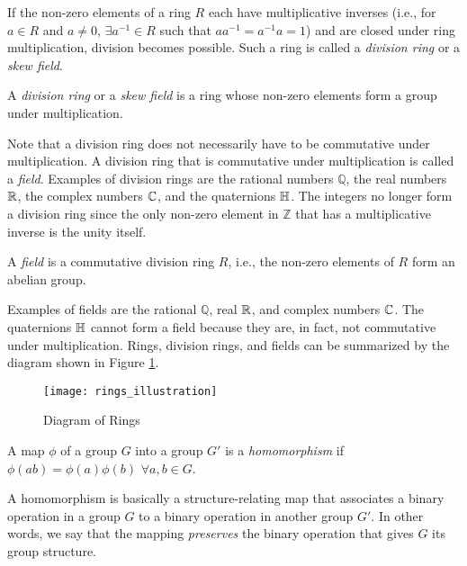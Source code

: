 If the non-zero elements of a ring $R$ each have multiplicative inverses (i.e., for $a\in R$ and $a\neq 0$, $\exists a^{-1} \in R$ such that $aa^{-1}=a^{-1}a=1$) and are closed under ring multiplication, division becomes possible. Such a ring is called a \emph{division ring} or a \emph{skew field}.

\begin{definition} \label{def:skewfield}
	\emph{\cite{fraleigh}} A \emph{division ring} or a \emph{skew field} is a ring whose non-zero elements form a group under multiplication.
\end{definition}

Note that a division ring does not necessarily have to be commutative under multiplication. A division ring that is commutative under multiplication is called a \emph{field}. Examples of division rings are the rational numbers $\mathbb{Q}$, the real numbers $\operatorname{\mathbb{R}}$, the complex numbers $\operatorname{\mathbb{C}}$, and the quaternions $\operatorname{\mathbb{H}}$. The integers no longer form a division ring since the only non-zero element in $\mathbb{Z}$ that has a multiplicative inverse is the unity itself.

\begin{definition}[Field] \label{def:field}
	\emph{\cite{fraleigh}} A \emph{field} is a commutative division ring $R$, i.e., the non-zero elements of $R$ form an abelian group.
\end{definition}

Examples of fields are the rational $\mathbb{Q}$, real $\operatorname{\mathbb{R}}$, and complex numbers $\operatorname{\mathbb{C}}$. The quaternions $\operatorname{\mathbb{H}}$ cannot form a field because they are, in fact, not commutative under multiplication. Rings, division rings, and fields can be summarized by the diagram shown in Figure \ref{fig:rings}.

\begin{figure}[H]
\centering
	\texttt{[image: rings\_illustration]}
	\caption{Diagram of Rings}
	\label{fig:rings}
\end{figure}

\begin{definition}[Homomorphism]
	\emph{\cite{fraleigh}} A map $\phi$ of a group $G$ into a group $G'$ is a \emph{homomorphism} if $\phi(ab)=\phi(a)\phi(b)$ $\forall a,b \in G$.
\end{definition}

A homomorphism is basically a structure-relating map that associates a binary operation in a group $G$ to a binary operation in another group $G'$. In other words, we say that the mapping \emph{preserves} the binary operation that gives $G$ its group structure. 

